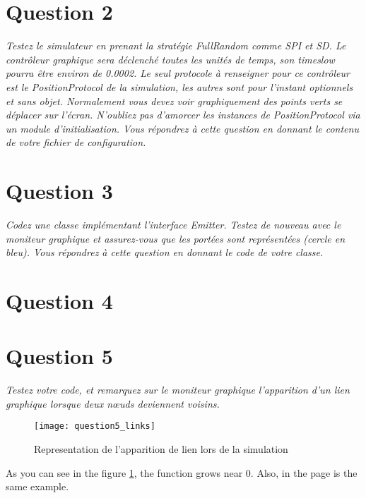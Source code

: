 \documentclass[11pt,a4paper,sans]{report}
\begin{document}
	\section{Question 2}
	\textit{Testez le simulateur en prenant la stratégie FullRandom comme SPI et SD. Le contrôleur graphique sera déclenché toutes les unités de temps, son timeslow pourra être environ de 0.0002. Le seul protocole à renseigner pour ce contrôleur est le PositionProtocol de la simulation, les autres sont pour l’instant optionnels et sans objet.  Normalement vous devez voir graphiquement des points verts se déplacer sur l’écran.  N’oubliez pas d’amorcer les instances de PositionProtocol via un module d’initialisation. Vous répondrez à cette question en donnant le contenu de votre fichier de configuration.}

	\section{Question 3}
	\textit{Codez une classe implémentant l’interface Emitter. Testez de nouveau avec le moniteur graphique et assurez-vous que les portées sont représentées (cercle en bleu).  Vous répondrez à cette question en donnant le code de votre classe.}


	\section{Question 4}

	\section{Question 5}
	\par\textit{Testez votre code, et remarquez sur le moniteur graphique l’apparition d’un lien graphique lorsque deux nœuds deviennent voisins.}
	\begin{figure}[h]
		\centering
		\texttt{[image: question5\_links]}
		\caption{Representation de l'apparition de lien lors de la simulation}
		\label{fig:mesh1}
	\end{figure}


	\par As you can see in the figure \ref{fig:mesh1}, the 
	function grows near 0. Also, in the page \pageref{fig:mesh1} 
	is the same example.
\end{document}
